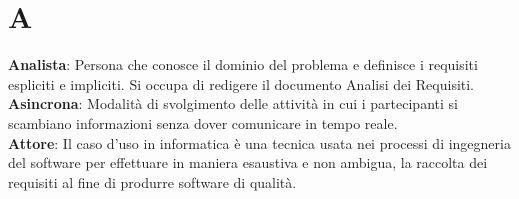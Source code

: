 \section{A}
\textbf{Analista}: Persona che conosce il dominio del problema e definisce i requisiti espliciti e impliciti. Si occupa di redigere il documento Analisi dei Requisiti.\\
\textbf{Asincrona}: Modalità di svolgimento delle attività in cui i partecipanti si scambiano informazioni senza dover comunicare in tempo reale.\\
\textbf{Attore}: Il caso d'uso in informatica è una tecnica usata nei processi di ingegneria del software per effettuare in maniera esaustiva e non ambigua, la raccolta dei requisiti al fine di produrre software di qualità.\\
